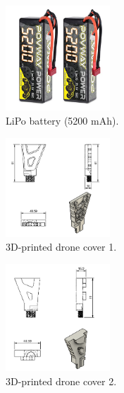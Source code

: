 \begin{figure}[H]
    \centering
    \label{fig:brushless_motor}
\end{figure}

\begin{figure}[H]
    \centering
    \label{fig:esc_module}
\end{figure}

\begin{figure}[H]
    \centering
    \includegraphics[width=0.35\textwidth]{pictures/lipo_baterry.jpg}
    \caption{LiPo battery (5200 mAh).}
    \label{fig:lipo_battery}
\end{figure}

\begin{figure}[H]
    \centering
    \label{fig:gps_module}
\end{figure}

\begin{figure}[H]
    \centering
    \includegraphics[width=0.35\textwidth]{PLANOS/PLANO_DRONE_COVER_1.png}
    \caption{3D-printed drone cover 1.}
    \label{fig:drone_cover_1}
\end{figure}

\begin{figure}[H]
    \centering
    \includegraphics[width=0.35\textwidth]{PLANOS/PLANO_DRONE_COVER_2.png}
    \caption{3D-printed drone cover 2.}
    \label{fig:drone_cover_2}
\end{figure}

